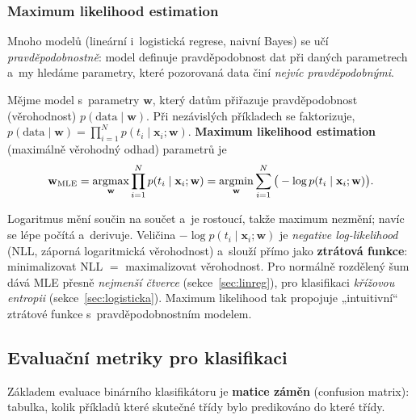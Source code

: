 \subsubsection*{Maximum likelihood estimation}

Mnoho modelů (lineární i~logistická regrese, naivní Bayes) se učí \emph{pravděpodobnostně}: model definuje pravděpodobnost dat při daných parametrech a~my hledáme parametry, které pozorovaná data činí \emph{nejvíc pravděpodobnými}.

\begin{definice}
Mějme model s~parametry $\mathbf{w}$, který datům přiřazuje pravděpodobnost (věrohodnost) $p(\text{data}\mid\mathbf{w})$. Při nezávislých příkladech se faktorizuje, $p(\text{data}\mid\mathbf{w})=\prod_{i=1}^N p(t_i\mid \mathbf{x}_i;\mathbf{w})$. \textbf{Maximum likelihood estimation} (maximálně věrohodný odhad) parametrů je
\[ \mathbf{w}_{\mathrm{MLE}} = \operatorname*{argmax}_{\mathbf{w}} \prod_{i=1}^N p(t_i\mid \mathbf{x}_i;\mathbf{w}) = \operatorname*{argmin}_{\mathbf{w}} \sum_{i=1}^N \big(-\log p(t_i\mid \mathbf{x}_i;\mathbf{w})\big). \]
\end{definice}

\begin{intuice}
Logaritmus mění součin na součet a~je rostoucí, takže maximum nezmění; navíc se lépe počítá a~derivuje. Veličina $-\log p(t_i\mid\mathbf{x}_i;\mathbf{w})$ je \emph{negative log-likelihood} (NLL, záporná logaritmická věrohodnost) a~slouží přímo jako \textbf{ztrátová funkce}: minimalizovat NLL $=$ maximalizovat věrohodnost. Pro normálně rozdělený šum dává MLE přesně \emph{nejmenší čtverce} (sekce~\ref{sec:linreg}), pro klasifikaci \emph{křížovou entropii} (sekce~\ref{sec:logisticka}). Maximum likelihood tak propojuje „intuitivní`` ztrátové funkce s~pravděpodobnostním modelem.
\end{intuice}

\subsection{Evaluační metriky pro klasifikaci}

Základem evaluace binárního klasifikátoru je \textbf{matice záměn} (confusion matrix): tabulka, kolik příkladů které skutečné třídy bylo predikováno do které třídy.

